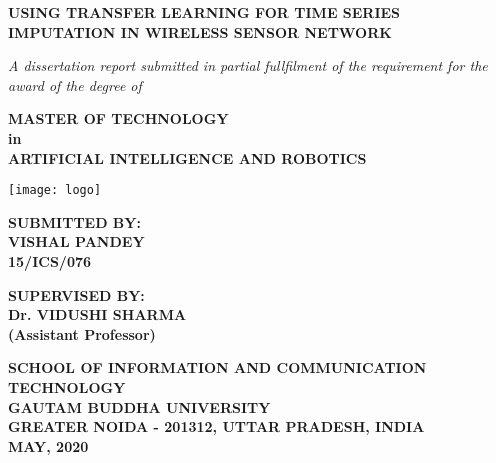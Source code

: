 \begin{titlepage}
	\begin{center}
	
		
		\Large
		\textbf{USING TRANSFER LEARNING FOR TIME SERIES IMPUTATION IN WIRELESS SENSOR NETWORK}
		
		\vspace{0.5cm}
		\large
		\textit{A dissertation report submitted in partial fullfilment of the requirement for the award of the degree of}
		
		\vspace{1.5cm}
		\textbf{MASTER OF TECHNOLOGY}\\
		\textbf{in}\\
		\textbf{ARTIFICIAL INTELLIGENCE AND ROBOTICS}\\
		
		\vfill
				
		
		\texttt{[image: logo]}\\

		\vfill
		
		\textbf{SUBMITTED BY:}\\
		\vspace{0.1cm}
		\textbf{VISHAL PANDEY}\\
		\textbf{15/ICS/076}
		
		\vspace{0.5cm}
		\textbf{SUPERVISED BY:}\\
		\vspace{0.1cm}
		\textbf{Dr. VIDUSHI SHARMA}\\
		\textbf{(Assistant Professor)}
		



		\vfill
		\normalsize
		\textbf{SCHOOL OF INFORMATION AND COMMUNICATION TECHNOLOGY} \\
		\textbf{GAUTAM BUDDHA UNIVERSITY} \\
		\textbf{GREATER NOIDA - 201312, UTTAR PRADESH, INDIA} \\
		\textbf{MAY, 2020}
		
	\end{center}
\end{titlepage}